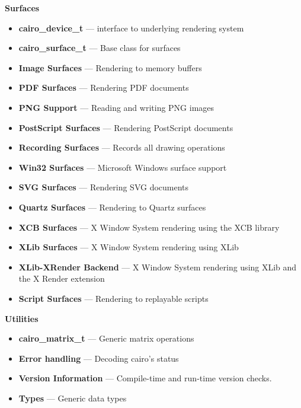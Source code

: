 \documentclass[12pt]{article}
\begin{document}
\begin{itemize}
\begin{itemize}
\end{itemize}


\textbf{Surfaces}

\begin{itemize}

\item \textbf{cairo\_device\_t} — interface to underlying rendering system
\item \textbf{cairo\_surface\_t} — Base class for surfaces
\item \textbf{Image Surfaces} — Rendering to memory buffers
\item \textbf{PDF Surfaces} — Rendering PDF documents
\item \textbf{PNG Support} — Reading and writing PNG images
\item \textbf{PostScript Surfaces} — Rendering PostScript documents
\item \textbf{Recording Surfaces} — Records all drawing operations
\item \textbf{Win32 Surfaces} — Microsoft Windows surface support
\item \textbf{SVG Surfaces} — Rendering SVG documents
\item \textbf{Quartz Surfaces} — Rendering to Quartz surfaces
\item \textbf{XCB Surfaces} — X Window System rendering using the XCB library
\item \textbf{XLib Surfaces} — X Window System rendering using XLib
\item \textbf{XLib-XRender Backend} — X Window System rendering using XLib and the X Render extension
\item \textbf{Script Surfaces} — Rendering to replayable scripts


\end{itemize}

\textbf{Utilities}

\begin{itemize}

\item \textbf{cairo\_matrix\_t} — Generic matrix operations
\item \textbf{Error handling} — Decoding cairo's status
\item \textbf{Version Information} — Compile-time and run-time version checks.
\item \textbf{Types} — Generic data types


\end{itemize}



\end{itemize}
\end{document}
